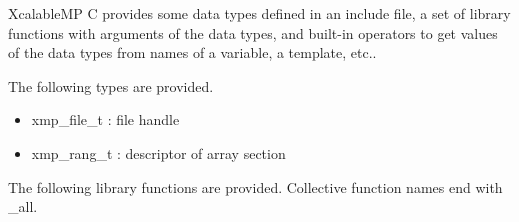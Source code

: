    XcalableMP C provides some data types defined in an include file, 
   a set of library functions with arguments of the data types, and
   built-in operators to get values of the data types from names of a variable, a template, etc..

   The following types are provided.

   \begin{itemize}
    \item xmp\_file\_t : file handle
    \item xmp\_rang\_t : descriptor of array section
   \end{itemize}

   The following library functions are provided.
   Collective function names end with \_all.

